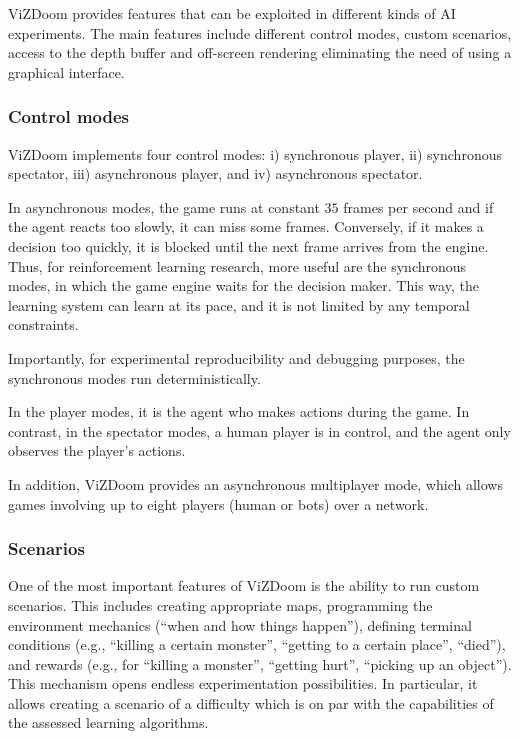 \documentclass[english,american,conference, balance]{IEEEtran}
\begin{document}
ViZDoom provides features that can be exploited in different kinds
of AI experiments. The main features include different control modes,
custom scenarios, access to the depth buffer and off-screen rendering
eliminating the need of using a graphical interface.

\subsubsection{Control modes}

ViZDoom implements four control modes: i) synchronous player, ii)
synchronous spectator, iii) asynchronous player, and iv) asynchronous
spectator. 

In asynchronous modes, the game runs at constant $35$ frames per
second and if the agent reacts too slowly, it can miss some frames.
Conversely, if it makes a decision too quickly, it is blocked until
the next frame arrives from the engine. Thus, for reinforcement learning
research, more useful are the synchronous modes, in which the game
engine waits for the decision maker. This way, the learning system
can learn at its pace, and it is not limited by any temporal constraints.

Importantly, for experimental reproducibility and debugging purposes,
the synchronous modes run deterministically.

In the player modes, it is the agent who makes actions during the
game. In contrast, in the spectator modes, a human player is in control,
and the agent only observes the player's actions.

In addition, ViZDoom provides an asynchronous multiplayer mode, which
allows games involving up to eight players (human or bots) over a
network.

\subsubsection{Scenarios}

One of the most important features of ViZDoom is the ability to run
custom scenarios. This includes creating appropriate maps, programming
the environment mechanics (``when and how things happen''), defining
terminal conditions (e.g., ``killing a certain monster'', ``getting
to a certain place'', ``died''), and rewards (e.g., for ``killing
a monster'', ``getting hurt'', ``picking up an object''). This
mechanism opens endless experimentation possibilities. In particular,
it allows creating a scenario of a difficulty which is on par with
the capabilities of the assessed learning algorithms.
\end{document}
